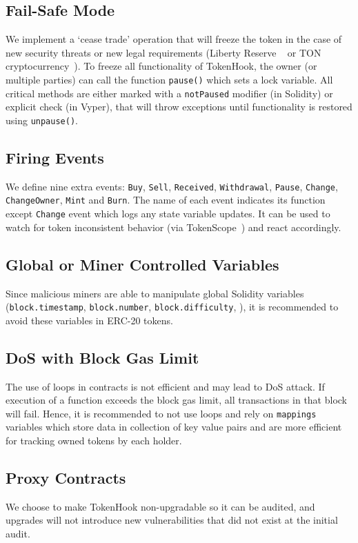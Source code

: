 \subsection*{Fail-Safe Mode} We implement a `cease trade' operation that will freeze the token in the case of new security threats or new legal requirements (\eg Liberty Reserve ~\cite{LibertyReserve} or TON cryptocurrency~\cite{TON}). To freeze all functionality of TokenHook, the owner (or multiple parties) can call the function \texttt{pause()} which sets a lock variable. All critical methods are either marked with a \texttt{notPaused} modifier (in Solidity) or explicit check (in Vyper), that will throw exceptions until functionality is restored using \texttt{unpause()}. 

\subsection*{Firing Events} We define nine extra events: \texttt{Buy}, \texttt{Sell}, \texttt{Received}, \texttt{Withdrawal}, \texttt{Pause}, \texttt{Change}, \texttt{ChangeOwner}, \texttt{Mint} and \texttt{Burn}. The name of each event indicates its function except \texttt{Change} event which logs any state variable updates. It can be used to watch for token inconsistent behavior (\eg via TokenScope~\cite{TokenScope}) and react accordingly. 

\subsection*{Global or Miner Controlled Variables}
Since malicious miners are able to manipulate global Solidity variables (\eg \texttt{block.timestamp}, \texttt{block.number}, \texttt{block.difficulty}, \etc), it is recommended to avoid these variables in ERC-20 tokens.

\subsection*{DoS with Block Gas Limit}
The use of loops in contracts is not efficient and may lead to DoS attack. If execution of a function exceeds the block gas limit, all transactions in that block will fail. Hence, it is recommended to not use loops and rely on \texttt{mappings} variables which store data in collection of key value pairs and are more efficient for tracking owned tokens by each holder.

\subsection*{Proxy Contracts} We choose to make TokenHook non-upgradable so it can be audited, and upgrades will not introduce new vulnerabilities that did not exist at the initial audit. 

